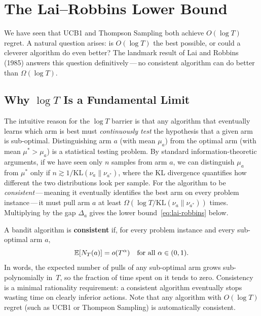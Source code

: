 \section{The Lai--Robbins Lower Bound}
\label{sec:lai-robbins}

We have seen that UCB1 and Thompson Sampling both achieve $O(\log T)$ regret.  A natural question arises: is $O(\log T)$ the best possible, or could a cleverer algorithm do even better?  The landmark result of Lai and Robbins (1985) answers this question definitively\,---\,no consistent algorithm can do better than $\Omega(\log T)$.

\subsection*{Why $\log T$ Is a Fundamental Limit}

The intuitive reason for the $\log T$ barrier is that any algorithm that eventually learns which arm is best must \emph{continuously test} the hypothesis that a given arm is sub-optimal.  Distinguishing arm $a$ (with mean $\mu_a$) from the optimal arm (with mean $\mu^*>\mu_a$) is a statistical testing problem.  By standard information-theoretic arguments, if we have seen only $n$ samples from arm $a$, we can distinguish $\mu_a$ from $\mu^*$ only if $n \gtrsim 1/\mathrm{KL}(\nu_a\|\nu_{a^*})$, where the KL divergence quantifies how different the two distributions look per sample.  For the algorithm to be \emph{consistent}\,---\,meaning it eventually identifies the best arm on every problem instance\,---\,it must pull arm $a$ at least $\Omega(\log T/\mathrm{KL}(\nu_a\|\nu_{a^*}))$ times.  Multiplying by the gap $\Delta_a$ gives the lower bound~\eqref{eq:lai-robbins} below.

\begin{definition}
\label{def:consistent}
A bandit algorithm is \textbf{consistent} if, for every problem instance and every sub-optimal arm $a$,
\[
\operatorname{\mathbb{E}}[N_T(a)] = o(T^\alpha) \quad \text{for all } \alpha \in (0,1).
\]
In words, the expected number of pulls of any sub-optimal arm grows sub-polynomially in~$T$, so the fraction of time spent on it tends to zero.  Consistency is a minimal rationality requirement: a consistent algorithm eventually stops wasting time on clearly inferior actions.  Note that any algorithm with $O(\log T)$ regret (such as UCB1 or Thompson Sampling) is automatically consistent.
\end{definition}

